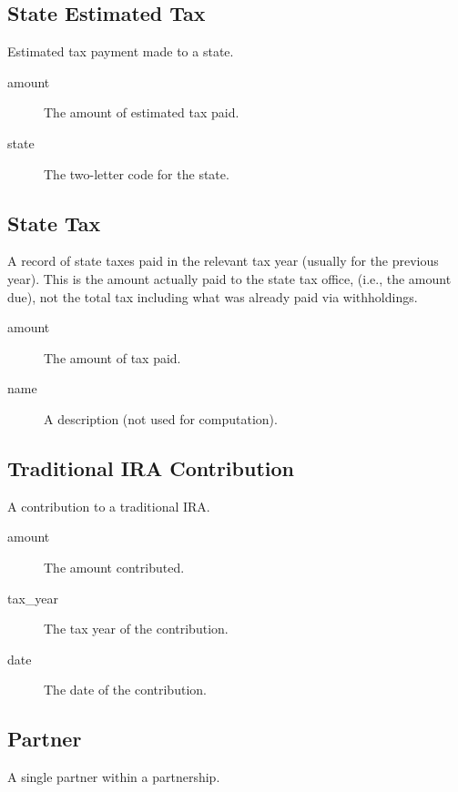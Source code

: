 \subsection{State Estimated Tax}

Estimated tax payment made to a state.

\begin{description}
\item[amount] The amount of estimated tax paid.
\item[state] The two-letter code for the state.
\end{description}




\subsection{State Tax}

A record of state taxes paid in the relevant tax year (usually for the previous
year). This is the amount actually paid to the state tax office, (i.e., the
amount due), not the total tax including what was already paid via withholdings.

\begin{description}
\item[amount] The amount of tax paid.
\item[name] A description (not used for computation).
\end{description}

\subsection{Traditional IRA Contribution}

A contribution to a traditional IRA.

\begin{description}
\item[amount] The amount contributed.
\item[tax\_year] The tax year of the contribution.
\item[date] The date of the contribution.
\end{description}


\subsection{Partner}

A single partner within a partnership.

